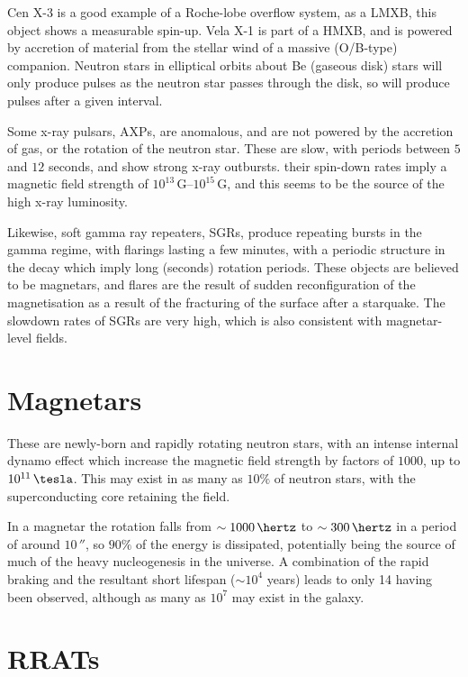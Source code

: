 Cen X-3 is a good example of a Roche-lobe overflow system, as a LMXB,
this object shows a measurable spin-up. Vela X-1 is part of a HMXB,
and is powered by accretion of material from the stellar wind of a
massive (O/B-type) companion. Neutron stars in elliptical orbits about
Be (gaseous disk) stars will only produce pulses as the neutron star
passes through the disk, so will produce pulses after a given
interval.

Some x-ray pulsars, AXPs, are anomalous, and are not powered by the
accretion of gas, or the rotation of the neutron star. These are slow,
with periods between $5$ and $12$ seconds, and show strong x-ray
outbursts. their spin-down rates imply a magnetic field strength of
$10^{13}\,\text{G}$--$10^{15}\,\text{G}$, and this seems to be the
source of the high x-ray luminosity.

Likewise, soft gamma ray repeaters, SGRs, produce repeating bursts in
the gamma regime, with flarings lasting a few minutes, with a periodic
structure in the decay which imply long (seconds) rotation
periods. These objects are believed to be magnetars, and flares are
the result of sudden reconfiguration of the magnetisation as a result
of the fracturing of the surface after a starquake. The slowdown rates
of SGRs are very high, which is also consistent with magnetar-level
fields.

\section{Magnetars}
\label{sec:magnetars}

These are newly-born and rapidly rotating neutron stars, with an
intense internal dynamo effect which increase the magnetic field
strength by factors of $1000$, up to $10^{11}\,\tesla$. This may exist
in as many as $10\%$ of neutron stars, with the superconducting core
retaining the field.

In a magnetar the rotation falls from $\sim 1000\,\hertz$ to $\sim
300\,\hertz$ in a period of around $10\,\second$, so $90\%$ of the
energy is dissipated, potentially being the source of much of the
heavy nucleogenesis in the universe. A combination of the rapid
braking and the resultant short lifespan ($\sim 10^4$ years) leads to
only 14 having been observed, although as many as $10^7$ may exist in
the galaxy.

\section{RRATs}
\label{sec:rrats}

